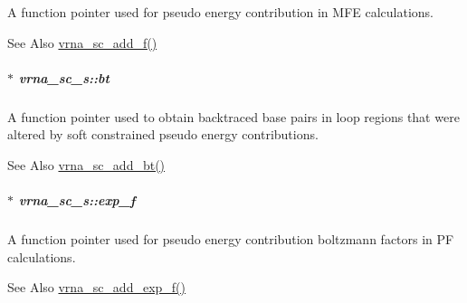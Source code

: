 A function pointer used for pseudo energy contribution in M\-F\-E calculations. 

\begin{DoxySeeAlso}{See Also}
\hyperlink{group__generalized__sc_ga8c7d907ec0125cd61c04e0908010a4e9}{vrna\-\_\-sc\-\_\-add\-\_\-f()} 
\end{DoxySeeAlso}
\hypertarget{group__soft__constraints_a2a2aca01782c2b980d7b7fd05b9be89c}{
\subparagraph[{bt}]{$\ast$ vrna\-\_\-sc\-\_\-s\-::bt}}\label{group__soft__constraints_a2a2aca01782c2b980d7b7fd05b9be89c}


A function pointer used to obtain backtraced base pairs in loop regions that were altered by soft constrained pseudo energy contributions. 

\begin{DoxySeeAlso}{See Also}
\hyperlink{group__generalized__sc_gabde7d07a79bb9a8f4721aee247b674ea}{vrna\-\_\-sc\-\_\-add\-\_\-bt()} 
\end{DoxySeeAlso}
\hypertarget{group__soft__constraints_a0de08a09f3ccf2f97974d23192668ab0}{
\subparagraph[{exp\-\_\-f}]{$\ast$ vrna\-\_\-sc\-\_\-s\-::exp\-\_\-f}}\label{group__soft__constraints_a0de08a09f3ccf2f97974d23192668ab0}


A function pointer used for pseudo energy contribution boltzmann factors in P\-F calculations. 

\begin{DoxySeeAlso}{See Also}
\hyperlink{group__generalized__sc_ga87e382b5d0c9b7d9ce1b79c0473ff700}{vrna\-\_\-sc\-\_\-add\-\_\-exp\-\_\-f()} 
\end{DoxySeeAlso}


